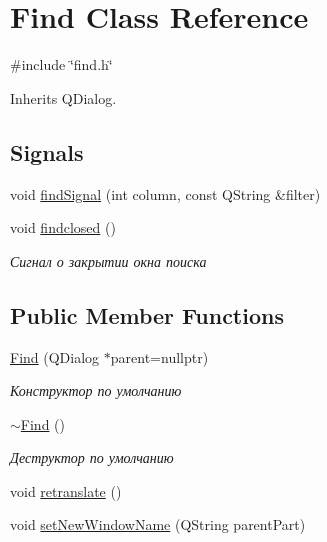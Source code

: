 \hypertarget{class_find}{}\section{Find Class Reference}
\label{class_find}


{\ttfamily \#include \char`\"{}find.\+h\char`\"{}}



Inherits Q\+Dialog.

\subsection*{Signals}
\begin{DoxyCompactItemize}
\item 
void \mbox{\hyperlink{class_find_a7d992611a1c754fdb7ca43c2b9ec923c}{find\+Signal}} (int column, const Q\+String \&filter)
\item 
\mbox{\label{class_find_adedfa88b1676fd1caba5bf5cbffc6a39}} 
void \mbox{\hyperlink{class_find_adedfa88b1676fd1caba5bf5cbffc6a39}{findclosed}} ()
\begin{DoxyCompactList}\small\item\em Сигнал о закрытии окна поиска \end{DoxyCompactList}\end{DoxyCompactItemize}
\subsection*{Public Member Functions}
\begin{DoxyCompactItemize}
\item 
\mbox{\label{class_find_a879536af8ea85361e3590a6373fa2756}} 
\mbox{\hyperlink{class_find_a879536af8ea85361e3590a6373fa2756}{Find}} (Q\+Dialog $\ast$parent=nullptr)
\begin{DoxyCompactList}\small\item\em Конструктор по умолчанию \end{DoxyCompactList}\item 
\mbox{\label{class_find_a709a6179dcc42145ddf2c811831a118c}} 
\mbox{\hyperlink{class_find_a709a6179dcc42145ddf2c811831a118c}{$\sim$\+Find}} ()
\begin{DoxyCompactList}\small\item\em Деструктор по умолчанию \end{DoxyCompactList}\item 
void \mbox{\hyperlink{class_find_ab9019aa36b83abe6380262c882b505ee}{retranslate}} ()
\item 
void \mbox{\hyperlink{class_find_a0894546da6a6c364ee15199f243e28aa}{set\+New\+Window\+Name}} (Q\+String parent\+Part)
\end{DoxyCompactItemize}
